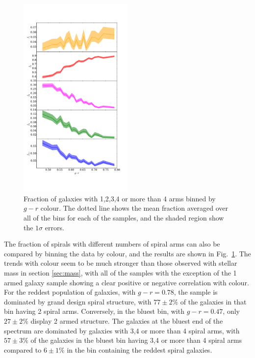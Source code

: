 \documentclass[useAMS,usenatbib]{mn2e}
\begin{document}
\begin{figure}
		\centering

        \includegraphics[width=0.5\textwidth]{Data_imgs/colour_plot.pdf}

        \caption{Fraction of galaxies with 1,2,3,4 or more than 4 arms binned by $g-r$ colour. The dotted line shows the mean fraction averaged over all of the bins for each of the samples, and the shaded region show the $1 \sigma$ errors.}

        \label{fig:colour_plot}

\end{figure}

The fraction of spirals with different numbers of spiral arms can also be compared by binning the data by colour, and the results are shown in Fig.~\ref{fig:colour_plot}. The trends with colour seem to be much stronger than those observed with stellar mass in section \ref{sec:mass}, with all of the samples with the exception of the 1 armed galaxy sample showing a clear positive or negative correlation with colour. For the reddest population of galaxies, with $g-r=0.78$, the sample is dominated by grand design spiral structure, with $77 \pm 2 \%$ of the galaxies in that bin having 2 spiral arms. Conversely, in the bluest bin, with $g-r=0.47$, only $27 \pm 2 \%$ display 2 armed structure. The galaxies at the bluest end of the spectrum are dominated by galaxies with 3,4 or more than 4 spiral arms, with $57 \pm 3 \%$ of the galaxies in the bluest bin having 3,4 or more than 4 spiral arms compared to $6 \pm 1 \%$ in the bin containing the reddest spiral galaxies.
\end{document}
